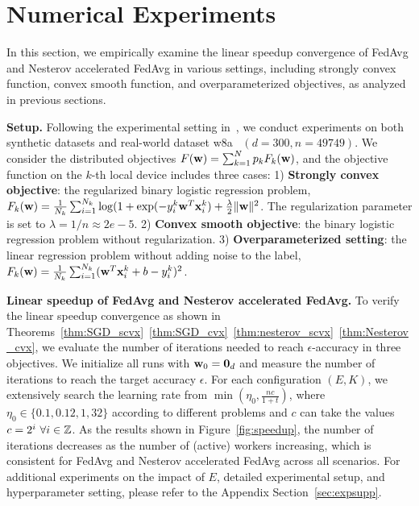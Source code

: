 \section{Numerical Experiments}
\label{sec:exp}

In this section, we empirically examine the linear speedup convergence of FedAvg and Nesterov accelerated FedAvg in various settings, including strongly convex function, convex smooth function, and overparameterized objectives, as analyzed in previous sections.

\textbf{Setup.} Following the experimental setting in~\cite{stich2018local}, we
conduct experiments on both synthetic datasets and real-world dataset
w8a~\cite{platt1998fast} $(d=300, n=49749)$. We consider the distributed
objectives $F({\mathbf{w}}) = \sum_{k=1}^N p_kF_k({\mathbf{w}})$, and the objective function on the
$k$-th local device includes three cases: 1) \textbf{Strongly convex
objective}: the regularized binary logistic regression problem, $F_k({\mathbf{w}}) =
\frac{1}{N_k} \sum_{i=1}^{N_k} \log( 1+ \exp(-y_i^k {\mathbf{w}}^T{\mathbf{x}}_i^k) + \frac{\lambda}{2}
\|{\mathbf{w}}\|^2$. The regularization parameter is set to $\lambda = 1/n \approx
2e-5$. 2) \textbf{Convex smooth objective}: the binary logistic regression
problem without regularization. 3) \textbf{Overparameterized setting}:
the linear regression problem without adding noise to the label, $F_k({\mathbf{w}}) =
\frac{1}{N_k} \sum_{i=1}^{N_k} ({\mathbf{w}}^T{\mathbf{x}}_i^k + b  - y_i^k)^2$.  

\textbf{Linear speedup of FedAvg and Nesterov accelerated FedAvg.} To verify the linear speedup convergence as shown in Theorems~\ref{thm:SGD_scvx}~\ref{thm:SGD_cvx}~\ref{thm:nesterov_scvx}~\ref{thm:Nesterov_cvx}, we evaluate the number of iterations needed to reach
$\epsilon$-accuracy in three objectives. We initialize all runs with ${\mathbf{w}}_0 = \textbf{0}_d$ and measure the number of iterations to reach the target accuracy $\epsilon$. For each configuration $(E, K)$, we extensively search the learning rate from $\min(\eta_0, \frac{nc}{1 + t})$, where
$\eta_0 \in \{0.1, 0.12, 1, 32 \}$ according to different problems and $c$ can
take the values $c = 2^i \ \forall i \in \mathbb{Z}$. As the results shown in Figure~\ref{fig:speedup},
the number of iterations decreases as the number of (active) workers increasing, which is consistent for FedAvg and Nesterov accelerated FedAvg across all scenarios.
For additional experiments on the impact of $E$, detailed experimental setup, and hyperparameter setting, please refer to the Appendix Section~\ref{sec:expsupp}.

